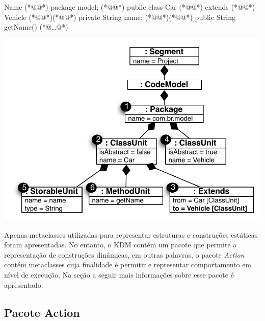 \noindent\begin{minipage}{.53\textwidth}
	\begin{codigo}[caption={[Parte de código Java para ilustrar como o KDM é usado para representar o código fonte.] Simples código em java.},escapeinside={(*@}{@*)}, basicstyle=\footnotesize, label={lst:example_kdm_instance}]{Name}
	(*@@*) package model;
	(*@@*) public class Car (*@@*) extends  
	(*@@*) Vehicle{
	(*@@*)(*@@*) private String name;
	(*@@*)(*@@*) public String getName(){
	(*@\ldots @*)
	}
	}
	\end{codigo}
\end{minipage}\hfill
\begin{minipage}{.45\textwidth}
	\centering
	\includegraphics[scale=0.6]{images/kdm_instance_java_correspoding_2_with_extends}
	\fautor
	\label{fig:kdm_instance_Java}
\end{minipage}


Apenas metaclasses utilizadas para representar estruturas e construções estáticas foram apresentadas. No entanto, o KDM contém um pacote que permite a representação de construções dinâmicas, em outras palavras, o pacote \textit{Action} contém metaclasses cuja finalidade é permitir e representar comportamento em nível de execução. Na seção a seguir mais informações sobre esse pacote é apresentado.

\subsection{Pacote Action}\label{sec:actionPackage}

